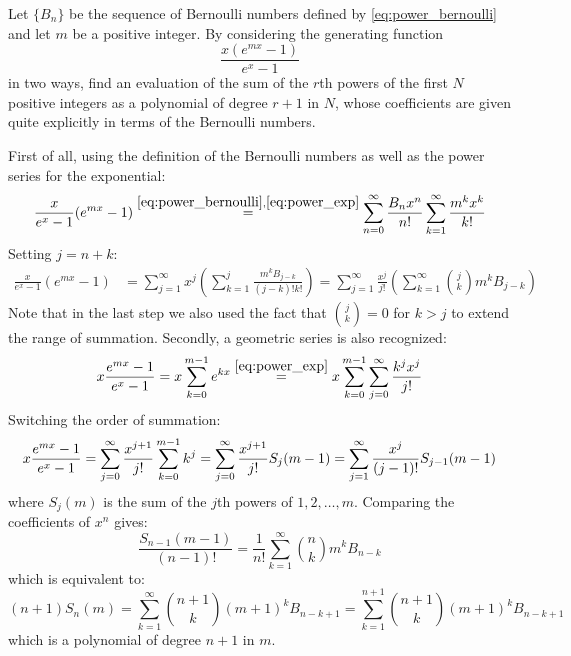 \begin{exercise}
    Let $\{B_n\}$ be the sequence of Bernoulli numbers defined by \eqref{eq:power_bernoulli} and let $m$ be a positive integer. By considering the generating function
    \[
        \frac{x(e^{mx}-1)}{e^x-1}
    \]
    in two ways, find an evaluation of the sum of the $r$th powers of the first $N$ positive integers as a polynomial of degree $r+1$ in $N$, whose coefficients are given quite explicitly in terms of the Bernoulli numbers.
\end{exercise}
\begin{solution}
    First of all, using the definition of the Bernoulli numbers as well as the power series for the exponential:
    \[
        \frac{x}{e^x - 1}(e^{mx} - 1) \estep{\eqref{eq:power_bernoulli}, \eqref{eq:power_exp}} \bsum \frac{B_n x^n}{n!} \sum_{k=1}^\infty \frac{m^kx^{k}}{k!}
    \] 
    Setting $j=n+k$:
    \begin{align*}
        \frac{x}{e^x-1}(e^{mx} - 1) &= \sum_{j=1}^\infty x^j \left(\sum_{k=1}^j \frac{m^kB_{j-k}}{(j-k)!k!}\right) = \sum_{j=1}^\infty \frac{x^j}{j!} \left(\sum_{k=1}^\infty \binom{j}{k}m^kB_{j-k}\right)
    \end{align*}
    Note that in the last step we also used the fact that $\binom{j}{k}=0$ for $k>j$ to extend the range of summation.
    Secondly, a geometric series is also recognized:
    \[
        x\frac{e^{mx} - 1}{e^x - 1} = x \sum_{k=0}^{m-1} e^{kx} \estep{\eqref{eq:power_exp}} x \sum_{k=0}^{m-1} \bsum[j] \frac{k^jx^j}{j!}
    \]
    Switching the order of summation:
    \[
        x\frac{e^{mx} - 1}{e^x - 1} = \bsum[j] \frac{x^{j+1}}{j!} \sum_{k=0}^{m-1} k^j = \bsum[j] \frac{x^{j+1}}{j!} S_j(m-1) = \sum_{j=1}^\infty \frac{x^j}{(j-1)!} S_{j-1}(m-1)
    \]
    where $S_j(m)$ is the sum of the $j$th powers of $1, 2, \ldots, m$. Comparing the coefficients of $x^n$ gives:
    \[
        \frac{S_{n-1}(m-1)}{(n-1)!} = \frac{1}{n!} \sum_{k=1}^\infty \binom{n}{k}m^k B_{n-k}
    \]
    which is equivalent to:
    \[
        (n+1)S_n(m) = \sum_{k=1}^\infty \binom{n+1}{k} (m+1)^k B_{n-k+1} = \sum_{k=1}^{n+1} \binom{n+1}{k} (m+1)^k B_{n-k+1}
    \]
    which is a polynomial of degree $n+1$ in $m$.
\end{solution}

